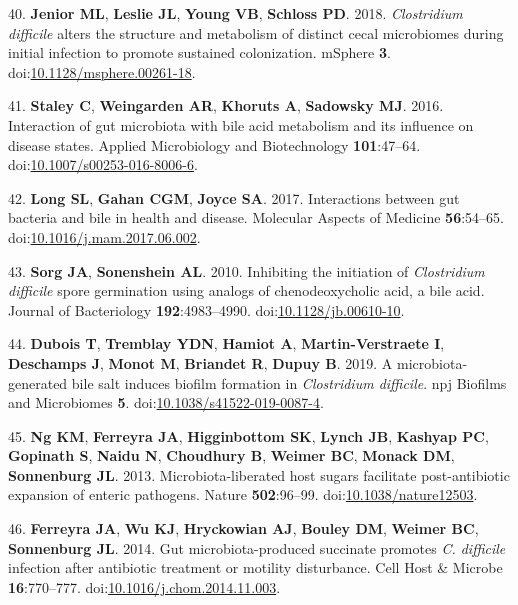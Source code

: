 \documentclass[
  12pt,
]{article}
\newenvironment{cslreferences}%
  {}%
  {\par}
\begin{document}
\begin{cslreferences}
\leavevmode\hypertarget{ref-Jenior2018}{}%
40. \textbf{Jenior ML}, \textbf{Leslie JL}, \textbf{Young VB},
\textbf{Schloss PD}. 2018. \emph{Clostridium difficile} alters the
structure and metabolism of distinct cecal microbiomes during initial
infection to promote sustained colonization. mSphere \textbf{3}.
doi:\href{https://doi.org/10.1128/msphere.00261-18}{10.1128/msphere.00261-18}.

\leavevmode\hypertarget{ref-Staley2016}{}%
41. \textbf{Staley C}, \textbf{Weingarden AR}, \textbf{Khoruts A},
\textbf{Sadowsky MJ}. 2016. Interaction of gut microbiota with bile acid
metabolism and its influence on disease states. Applied Microbiology and
Biotechnology \textbf{101}:47--64.
doi:\href{https://doi.org/10.1007/s00253-016-8006-6}{10.1007/s00253-016-8006-6}.

\leavevmode\hypertarget{ref-Long2017}{}%
42. \textbf{Long SL}, \textbf{Gahan CGM}, \textbf{Joyce SA}. 2017.
Interactions between gut bacteria and bile in health and disease.
Molecular Aspects of Medicine \textbf{56}:54--65.
doi:\href{https://doi.org/10.1016/j.mam.2017.06.002}{10.1016/j.mam.2017.06.002}.

\leavevmode\hypertarget{ref-Sorg2010}{}%
43. \textbf{Sorg JA}, \textbf{Sonenshein AL}. 2010. Inhibiting the
initiation of \emph{Clostridium difficile} spore germination using
analogs of chenodeoxycholic acid, a bile acid. Journal of Bacteriology
\textbf{192}:4983--4990.
doi:\href{https://doi.org/10.1128/jb.00610-10}{10.1128/jb.00610-10}.

\leavevmode\hypertarget{ref-Dubois2019}{}%
44. \textbf{Dubois T}, \textbf{Tremblay YDN}, \textbf{Hamiot A},
\textbf{Martin-Verstraete I}, \textbf{Deschamps J}, \textbf{Monot M},
\textbf{Briandet R}, \textbf{Dupuy B}. 2019. A microbiota-generated bile
salt induces biofilm formation in \emph{Clostridium difficile}. npj
Biofilms and Microbiomes \textbf{5}.
doi:\href{https://doi.org/10.1038/s41522-019-0087-4}{10.1038/s41522-019-0087-4}.

\leavevmode\hypertarget{ref-Ng2013}{}%
45. \textbf{Ng KM}, \textbf{Ferreyra JA}, \textbf{Higginbottom SK},
\textbf{Lynch JB}, \textbf{Kashyap PC}, \textbf{Gopinath S},
\textbf{Naidu N}, \textbf{Choudhury B}, \textbf{Weimer BC},
\textbf{Monack DM}, \textbf{Sonnenburg JL}. 2013. Microbiota-liberated
host sugars facilitate post-antibiotic expansion of enteric pathogens.
Nature \textbf{502}:96--99.
doi:\href{https://doi.org/10.1038/nature12503}{10.1038/nature12503}.

\leavevmode\hypertarget{ref-Ferreyra2014}{}%
46. \textbf{Ferreyra JA}, \textbf{Wu KJ}, \textbf{Hryckowian AJ},
\textbf{Bouley DM}, \textbf{Weimer BC}, \textbf{Sonnenburg JL}. 2014.
Gut microbiota-produced succinate promotes \emph{C. difficile} infection
after antibiotic treatment or motility disturbance. Cell Host \& Microbe
\textbf{16}:770--777.
doi:\href{https://doi.org/10.1016/j.chom.2014.11.003}{10.1016/j.chom.2014.11.003}.


\end{cslreferences}
\end{document}
